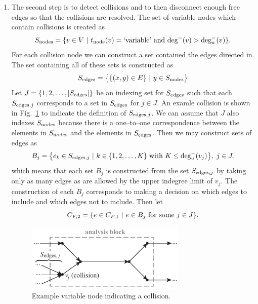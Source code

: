 \begin{enumerate}
\item The second step is to detect collisions and to then disconnect enough free edges so that the collisions are resolved. The set of variable nodes which contain collisions is created as
\begin{equation}
S_\textrm{nodes} = \{v \in V \ | \  t_\textrm{node}(v) = \textrm{`variable'} \textrm{ and } \textrm{deg}^-(v) > \textrm{deg}_u^-(v) \}.
\end{equation}
For each collision node we can construct a set contained the edges directed in. The set containing all of these sets is constructed as
\begin{equation}
S_\textrm{edges} = \big \{ \{(x,y) \in E\} \ | \  y \in S_\textrm{nodes} \big \}
\end{equation}
Let $J=\{1,2,\ldots,|S_\textrm{edges}|\}$ be an indexing set for $S_\textrm{edges}$ such that each $S_{\textrm{edges},j}$ corresponds to a set in $S_\textrm{edges}$ for $j \in J$. An examle collision is shown in Fig.~\ref{f:collision} to indicate the definition of $S_{\textrm{edges},j}$. We can assume that $J$ also indexes $S_\textrm{nodes}$ because there is a one--to--one correspondence between the elements in $S_\textrm{nodes}$ and the elements in $S_\textrm{edges}$. Then we may construct sets of edges as
\begin{equation}
B_j = \big \{e_k \in S_{\textrm{edges},j} \ | \  k \in \{1,2,\ldots,K\} \textrm{ with } K \leq \textrm{deg}_u^-(v_j) \big \}, \ j \in J,
\end{equation}
which means that each set $B_j$ is constructed from the set $S_{\textrm{edges},j}$ by taking only as many edges as are allowed by the upper indegree limit of $v_j$. The construction of each $B_j$ corresponds to making a decision on which edges to include and which edges not to include. Then let
\begin{equation}
C_{F,2} = \{ e \in C_{F,1} \ | \  e \in B_j \textrm{ for some } j \in J\}.
\end{equation}
\begin{figure}[htb!]
	\begin{center}
	\includegraphics[width=3in]{images/analysis_block_collision}
	\end{center}
	\vspace{-20pt}
\caption{Example variable node indicating a collision.}
\label{f:collision}
\end{figure}


\end{enumerate}
